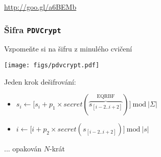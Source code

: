 \documentclass[usenames,dvipsnames,9pt]{beamer}
\begin{document}
\begin{frame}[standout]
  \url{http://goo.gl/a6BEMb}
\end{frame}



{
\begin{frame}[fragile]
  \frametitle{Šifra \texttt{PDVCrypt}}
  Vzpomeňte si na šifru z minulého cvičení
  \begin{center}
    \texttt{[image: figs/pdvcrypt.pdf]}
  \end{center}

  {\small
  Jeden krok dešifrování:
  \vspace{-1em}
  \begin{itemize}
    \item $s_i \gets \Big[ s_i + p_1 \times secret(\overbrace{s_{[i-2 .. i+2]}}^{\text{EQRBF}}) \Big] \ \mathrm{mod}\ |\Sigma|$
    \item $i \gets \Big[ i + p_2 \times secret(s_{[i-2 .. i+2]}) \Big] \ \mathrm{mod} \ |s|$
  \end{itemize}
  ... opakován $N$-krát}

  \vspace{1em}
\end{frame}
}
\end{document}
